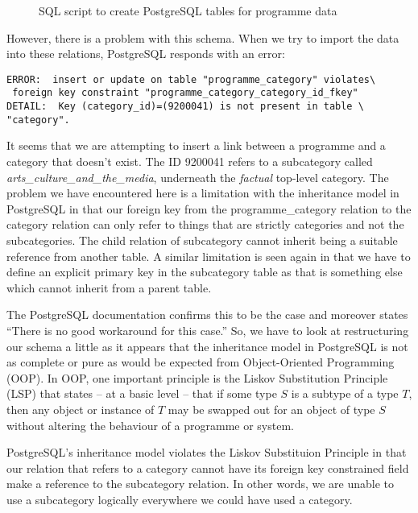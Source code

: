 \documentclass[11pt,a4paper]{article}
\begin{document}
\begin{figure}[p]
  
  \caption{SQL script to create PostgreSQL tables for programme data}
  \label{fig:create_table}
\end{figure}

However, there is a problem with this schema. When we try to import the
data into these relations, PostgreSQL responds with an error:

\begin{verbatim}
ERROR:  insert or update on table "programme_category" violates\
 foreign key constraint "programme_category_category_id_fkey"
DETAIL:  Key (category_id)=(9200041) is not present in table \
"category".
\end{verbatim}

It seems that we are attempting to insert a link between a programme and
a category that doesn't exist. The ID 9200041 refers to a subcategory called
\emph{arts\_culture\_and\_the\_media}, underneath the \emph{factual} top-level
category. The problem we have encountered here is a limitation with the
inheritance model in PostgreSQL in that our foreign key from the
programme\_category relation to the category relation can only refer to things
that are strictly categories and not the subcategories. The child relation
of subcategory cannot inherit being a suitable reference from another table.
A similar limitation is seen again in that we have to define an explicit
primary key in the subcategory table as that is something else which
cannot inherit from a parent table.

The PostgreSQL documentation \cite{postgres-docs} confirms this to be the
case and moreover states ``There is no good workaround for this case.'' So,
we have to look at restructuring our schema a little as it appears that
the inheritance model in PostgreSQL is not as complete or pure as would
be expected from Object-Oriented Programming (OOP). In OOP, one important
principle is the Liskov Substitution Principle (LSP) that states -- at
a basic level -- that if some type $S$ is a subtype of a type $T$, then
any object or instance of $T$ may be swapped out for an object of
type $S$ without altering the behaviour of a programme or system.

PostgreSQL's inheritance model violates the Liskov Substituion Principle
in that our relation that refers to a category cannot have its foreign key
constrained field make a reference to the subcategory relation. In other
words, we are unable to use a subcategory logically everywhere we could
have used a category.
\end{document}

